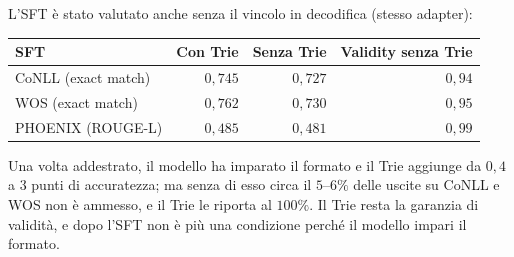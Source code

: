 L'SFT è stato valutato anche senza il vincolo in decodifica (stesso adapter):

\begin{center}
\small
\begin{tabular}{lrrr}
\toprule
SFT & Con Trie & Senza Trie & Validity senza Trie \\
\midrule
CoNLL (exact match) & $0{,}745$ & $0{,}727$ & $0{,}94$ \\
WOS (exact match)   & $0{,}762$ & $0{,}730$ & $0{,}95$ \\
PHOENIX (ROUGE-L)   & $0{,}485$ & $0{,}481$ & $0{,}99$ \\
\bottomrule
\end{tabular}
\end{center}

Una volta addestrato, il modello ha imparato il formato e il Trie aggiunge da
$0{,}4$ a $3$ punti di accuratezza; ma senza di esso circa il $5$--$6\%$ delle
uscite su CoNLL e WOS non è ammesso, e il Trie le riporta al $100\%$. Il Trie
resta la garanzia di validità, e dopo l'SFT non è più una condizione perché il
modello impari il formato.
